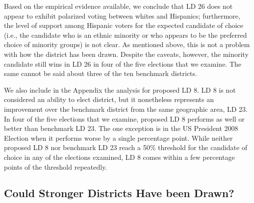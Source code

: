 \documentclass[12pt]{article}
\begin{document}
Based on the empirical evidence available, we conclude that LD 26 does
not appear to exhibit polarized voting between whites and Hispanics;
furthermore, the level of support among Hispanic voters for the
expected candidate of choice (i.e., the candidate who is an ethnic
minority or who appears to be the preferred choice of minority groups)
is not clear. As mentioned above, this is not a problem with how the district
has been drawn. Despite the caveats, however, the
minority candidate still wins in LD 26 in four of the five elections
that we examine. The same cannot be said about three of the ten
benchmark districts.

We also include in the Appendix the analysis for proposed LD 8. LD 8 is not considered 
an ability to elect district, but it nonetheless represents an improvement over the benchmark 
district from the same geographic area, LD 23. In four of the five elections that we examine,
proposed LD 8 performs as well or better than benchmark LD 23. The one exception is in the US
President 2008 Election when it performs worse by a single percentage point. While neither proposed LD 8 nor benchmark
LD 23 reach a 50\% threshold for the candidate of choice in any of the elections examined, LD 8 comes within a few percentage points of the threshold repeatedly.


\subsection{Could Stronger Districts Have been Drawn?}
\end{document}
